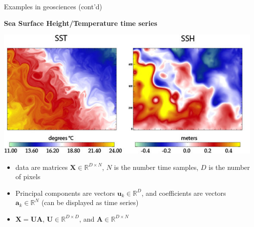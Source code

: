 \documentclass{beamer}
\begin{document}
\begin{frame}{Examples in geosciences (cont'd)}

\textbf{Sea Surface Height/Temperature time series}

\begin{center}
\includegraphics[scale = 1.6]{SST_SSH.png}
\end{center}

\begin{itemize}
\item data are matrices $\mathbf{X}\in\mathbb{R}^{D\times N}$, $N$ is the number time samples, $D$ is the number of pixels
\item Principal components are vectors $\mathbf{u}_{k} \in  \mathbb{R}^{D}$, and coefficients are vectors $\boldsymbol{a}_{k} \in \mathbb{R}^{N}$ (can be displayed as time series)
\item $\mathbf{X} = \mathbf{U}\mathbf{A}$,  $\mathbf{U} \in \mathbb{R}^{D\times D}$, and $\mathbf{A} \in \mathbb{R}^{D\times N}$ 
\end{itemize}

\end{frame}
\end{document}
